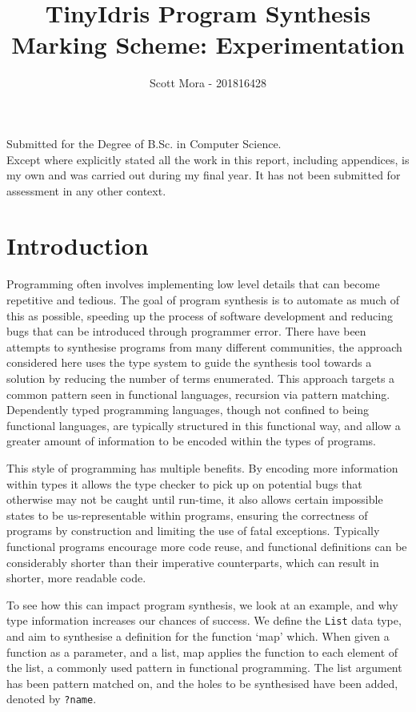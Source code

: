 \documentclass[a4paper]{article}
\author{Scott Mora - 201816428}
\date{}
\title{TinyIdris Program Synthesis\\\medskip
\large Marking Scheme: Experimentation}
\begin{document}
\maketitle
\begin{center}
\vspace{15mm}
Submitted for the Degree of B.Sc. in Computer Science. \\
\vspace{15mm}
Except where explicitly stated all the work in this report, including appendices, is my own and was carried out during my final year. It has not been submitted for assessment in any other context. 
 \end{center}
\clearpage
\tableofcontents
\clearpage

\section{Introduction}
\label{sec:orgf1aad56}

Programming often involves implementing low level details that can become
repetitive and tedious. The goal of program synthesis is to automate as much of this as
possible, speeding up the process of software development and reducing
bugs that can be introduced through programmer error. There have been
attempts to synthesise programs from many different communities,
the approach considered here uses the type system to guide the synthesis
tool towards a solution by reducing the number of terms enumerated.
This approach targets a common pattern seen in functional languages,
recursion via pattern matching. Dependently typed programming languages, 
though not confined to being functional languages, are typically 
structured in this functional way, and allow a greater amount of 
information to be encoded within the types of programs. 

This style of programming has multiple benefits. By encoding more 
information within types it allows the type checker to pick up on 
potential bugs that otherwise may not be caught until run-time, it also 
allows certain impossible states to be us-representable within programs,
ensuring the correctness of programs by construction and limiting the use of fatal 
exceptions. Typically functional programs encourage more code reuse,
and functional definitions can be considerably shorter than their 
imperative counterparts, which can result in shorter, more readable code.

To see how this can impact program synthesis, we look at an example, 
and why type information increases our chances of success. 
We define the \texttt{List} data type, and aim to synthesise a definition for
the function `map' which. When given a function as a parameter, and a 
list, map applies the function to each element of the list, a commonly 
used pattern in functional programming. The list argument has been
pattern matched on, and the holes to be synthesised have been added,
denoted by \texttt{?name}.
\end{document}
